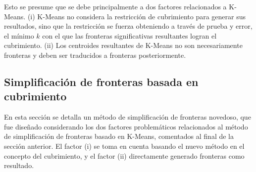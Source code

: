 


Esto se presume que se debe principalmente a dos factores relacionados a
K-Means. (i) K-Means no considera la restricción de cubrimiento para generar
sus resultados, sino que la restricción se fuerza obteniendo a través de prueba
y error, el mínimo $k$ con el que las fronteras significativas resultantes
logran el cubrimiento. (ii) Los centroides resultantes de K-Means no son
necesariamente fronteras y deben ser traducidos a fronteras posteriormente.







\subsection{Simplificación de fronteras basada en cubrimiento}\label{subsec:MiSimp}
En esta sección se detalla un método de simplificación de fronteras novedoso,
que fue diseñado considerando los dos factores problemáticos relacionados al
método de simplificación de fronteras basado en K-Means, comentados
al final de la sección anterior. El factor (i) se toma en cuenta basando el
nuevo método en el concepto del cubrimiento, y el factor (ii) directamente
generado fronteras como resultado.

